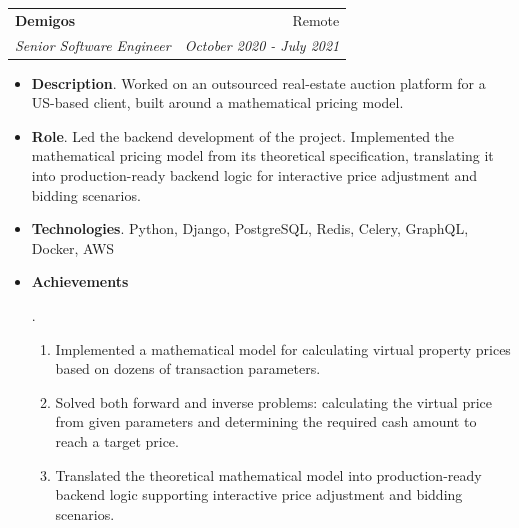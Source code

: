 \documentclass[letterpaper,11pt]{article}
\makeatletter
\newcommand{\resumeItem}[2]{
  \item\small{
    \textbf{#1}{. #2 \vspace{-2pt}}
  }
}
\newcommand{\resumeSubheading}[4]{
  \vspace{-1pt}\item
    \begin{tabular*}{0.97\textwidth}{l@{\extracolsep{\fill}}r}
      \textbf{#1} & #2 \\
      \textit{\small#3} & \textit{\small #4} \\
    \end{tabular*}\vspace{-5pt}
}
\newcommand{\resumeItemListStart}{\begin{itemize}}
\newcommand{\resumeItemListEnd}{\end{itemize}\vspace{-5pt}}
\makeatother
\begin{document}
    \resumeSubheading
      {Demigos}{Remote}
      {Senior Software Engineer}{October 2020 - July 2021}
      \resumeItemListStart
        \resumeItem{Description}
          {Worked on an outsourced real-estate auction platform for a US-based client, built around a mathematical pricing model.}
        \resumeItem{Role}
          {Led the backend development of the project. Implemented the mathematical pricing model from its theoretical specification, translating it into production-ready backend logic for interactive price adjustment and bidding scenarios.}
        \resumeItem{Technologies}
          {Python, Django, PostgreSQL, Redis, Celery, GraphQL, Docker, AWS}
        \resumeItem{Achievements}
  {
    \begin{enumerate}
      \item Implemented a mathematical model for calculating virtual property prices based on dozens of transaction parameters.
      \item Solved both forward and inverse problems: calculating the virtual price from given parameters and determining the required cash amount to reach a target price.
      \item Translated the theoretical mathematical model into production-ready backend logic supporting interactive price adjustment and bidding scenarios.
    \end{enumerate}
  }
      \resumeItemListEnd
\end{document}
